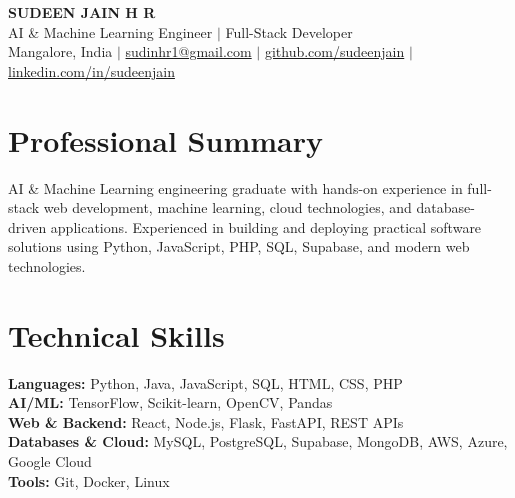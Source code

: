 \documentclass[10pt,letterpaper]{article}
\begin{document}
\begin{center}
  {\LARGE\bfseries SUDEEN JAIN H R}\\[2pt]
  {\normalsize AI \& Machine Learning Engineer $|$ Full-Stack Developer}\\[4pt]
  \small
  Mangalore, India $|$
  \href{mailto:sudinhr1@gmail.com}{sudinhr1@gmail.com} $|$
  \href{https://github.com/sudeenjain}{github.com/sudeenjain} $|$
  \href{https://linkedin.com/in/sudeenjain}{linkedin.com/in/sudeenjain}
\end{center}

\section{Professional Summary}
AI \& Machine Learning engineering graduate with hands-on experience in full-stack web development, machine learning, cloud technologies, and database-driven applications. Experienced in building and deploying practical software solutions using Python, JavaScript, PHP, SQL, Supabase, and modern web technologies.

\section{Technical Skills}
\textbf{Languages:} Python, Java, JavaScript, SQL, HTML, CSS, PHP\\
\textbf{AI/ML:} TensorFlow, Scikit-learn, OpenCV, Pandas\\
\textbf{Web \& Backend:} React, Node.js, Flask, FastAPI, REST APIs\\
\textbf{Databases \& Cloud:} MySQL, PostgreSQL, Supabase, MongoDB, AWS, Azure, Google Cloud\\
\textbf{Tools:} Git, Docker, Linux
\end{document}
